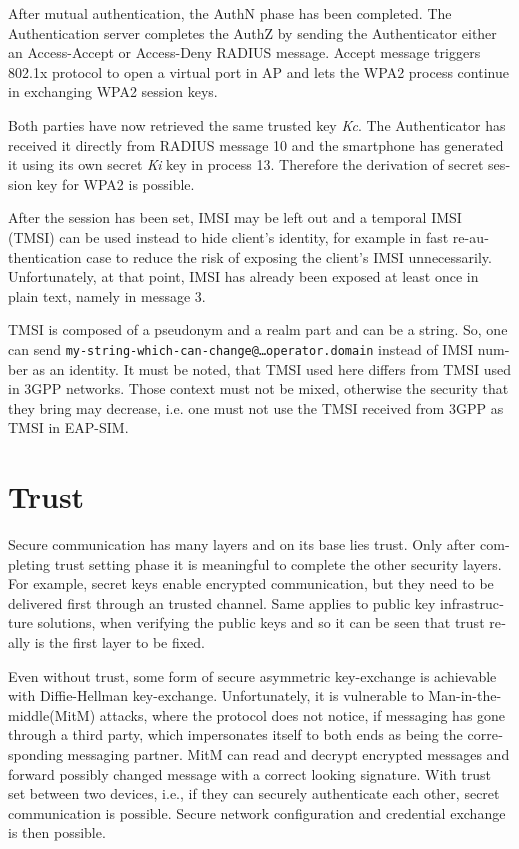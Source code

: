 \documentclass[12pt,a4paper,english]{tutthesis}
\begin{document}
\begin{otherlanguage}{english}
After mutual authentication, the AuthN phase has been completed. The
Authentication server completes the AuthZ by sending the Authenticator either
an Access-Accept or Access-Deny RADIUS message. 
Accept message triggers 802.1x protocol to open a virtual port in AP
and lets the WPA2 process continue in exchanging WPA2 session keys. 

Both parties have now retrieved the same trusted key \emph{Kc}. The
Authenticator has received it directly from RADIUS message 10 and the
smartphone has generated it using its own secret \emph{Ki} key in
process 13.
Therefore the derivation of secret session key for WPA2 is possible.

After the session has been set, IMSI may be left out and a temporal IMSI
(TMSI) can be used instead to hide client's identity, for example in
fast re-authentication case to reduce the risk of exposing the client's
IMSI unnecessarily. Unfortunately, at that point, IMSI has already
been exposed at least once in plain text, namely in message 3.

TMSI is composed of a pseudonym and a realm part and can be a
string. So, one can send 
\texttt{my-string-which-can-change@…operator.domain} instead of 
IMSI number as an identity. 
It must be noted, that TMSI used here differs from TMSI used in 3GPP
networks. Those context must not be mixed, otherwise the security that
they bring may decrease, i.e. one must not use the TMSI received from
3GPP as TMSI in EAP-SIM.
\section{Trust}
\label{sec-2-7}

Secure communication has many layers and on its base lies trust. 
Only after completing trust setting phase it is meaningful to complete
the other security layers. For example, secret keys enable encrypted
communication, but they need to be delivered first through an trusted
channel. Same applies to public key infrastructure solutions, when
verifying the public keys and so it can be seen that trust
really is the first layer to be fixed.



Even without trust, some form of secure asymmetric key-exchange is achievable
with Diffie-Hellman key-exchange\cite{diffie1976new}. Unfortunately, it is vulnerable
to Man-in-the-middle(MitM) attacks, where the protocol does not notice, 
if messaging has gone through a third party, which impersonates itself to 
both ends as being the corresponding messaging partner. MitM can
read and decrypt encrypted messages and forward possibly changed message with
a correct looking signature.
With trust set between two devices, i.e.,  if they can securely
authenticate each other, secret communication is possible. 
Secure network configuration and credential exchange is then possible.




\end{otherlanguage}
\end{document}
